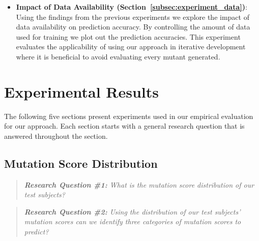\begin{itemize}
  \item \textbf{Impact of Data Availability (Section~\ref{subsec:experiment_data})}: Using the findings from the previous experiments we explore the impact of data availability on prediction accuracy. By controlling the amount of data used for training we plot out the prediction accuracies. This experiment evaluates the applicability of using our approach in iterative development where it is beneficial to avoid evaluating every mutant generated.
\end{itemize}


\section{Experimental Results}
\label{sec:experiment_results}
The following five sections present experiments used in our empirical evaluation for our approach. Each section starts with a general research question that is answered throughout the section.


\subsection{Mutation Score Distribution}
\label{subsec:experiment_mutation_score_distribution}
\begin{quote}
	\emph{\textbf{Research Question \#1:} What is the mutation score distribution of our test subjects?}
\end{quote}

\begin{quote}
	\emph{\textbf{Research Question \#2:} Using the distribution of our test subjects' mutation scores can we identify three categories of mutation scores to predict?}
\end{quote}

